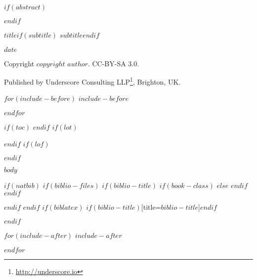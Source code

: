 \documentclass[$if(fontsize)$$fontsize$$else$12pt$endif$,$if(lang)$$lang$,$endif$$if(papersize)$$papersize$,$endif$$for(classoption)$$classoption$$sep$,$endfor$]{$documentclass$}
\renewcommand{\href}[2]{#2\footnote{\url{#1}}}
\begin{document}

\pagecolor{white}


$if(abstract)$
\begin{abstract}
$abstract$
\end{abstract}
$endif$


\vspace*{\fill}

\begin{center}

{\Large $title$$if(subtitle)$ $subtitle$$endif$}

$date$

Copyright $copyright$ $author$. CC-BY-SA 3.0.

Published by \href{http://underscore.io}{Underscore Consulting LLP}, Brighton, UK.

\end{center}

\vspace{1em}

$for(include-before)$
$include-before$

$endfor$

\vspace*{\fill}


$if(toc)$
{
\hypersetup{linkcolor=black}
\setcounter{tocdepth}{$if(toc-depth)$$toc-depth$$else$3$endif$}
\tableofcontents
}
$endif$
$if(lot)$
\listoftables
$endif$
$if(lof)$
\listoffigures
$endif$


$body$


$if(natbib)$
$if(biblio-files)$
$if(biblio-title)$
$if(book-class)$
\renewcommand\bibname{$biblio-title$}
$else$
\renewcommand\refname{$biblio-title$}
$endif$
$endif$


$endif$
$endif$
$if(biblatex)$
\printbibliography$if(biblio-title)$[title=$biblio-title$]$endif$

$endif$


$for(include-after)$
$include-after$

$endfor$

\end{document}
